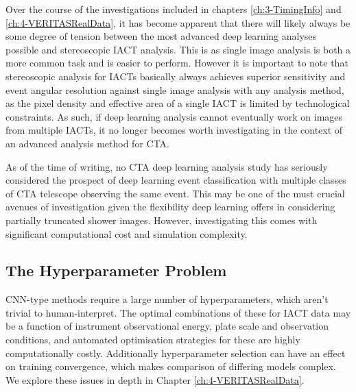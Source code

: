 Over the course of the investigations included in chapters \ref{ch:3-TimingInfo} and \ref{ch:4-VERITASRealData}, it has become apparent that there will likely always be some degree of tension between the most advanced deep learning analyses possible and stereoscopic IACT analysis. This is as single image analysis is both a more common task and is easier to perform.  However it is important to note that stereoscopic analysis for IACTs basically always achieves superior sensitivity and event angular resolution against single image analysis with any analysis method, as the pixel density and effective area of a single IACT is limited by technological constraints. As such, if deep learning analysis cannot eventually work on images from multiple IACTs, it no longer becomes worth investigating in the context of an advanced analysis method for CTA.

As of the time of writing, no CTA deep learning analysis study has seriously considered the prospect of deep learning event classification with multiple classes of CTA telescope observing the same event. This may be one of the must crucial avenues of investigation given the flexibility deep learning offers in considering partially truncated shower images. However, investigating this comes with significant computational cost and simulation complexity.

\subsection{The Hyperparameter Problem}
CNN-type methods require a large number of hyperparameters, which aren't trivial to human-interpret. The optimal combinations of these for IACT data may be a function of instrument observational energy, plate scale and observation conditions, and automated optimisation strategies for these are highly computationally costly. Additionally hyperparameter selection can have an effect on training convergence, which makes comparison of differing models complex. We explore these issues in depth in Chapter \ref{ch:4-VERITASRealData}.

